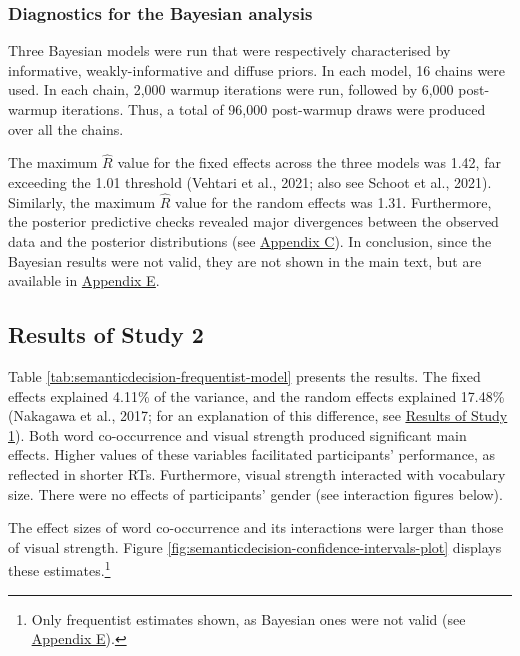 \documentclass[
  12pt,
  man,floatsintext]{apa7}
\begin{document}
\hypertarget{diagnostics-for-the-bayesian-analysis-1}{%
\subsubsection{Diagnostics for the Bayesian analysis}\label{diagnostics-for-the-bayesian-analysis-1}}

Three Bayesian models were run that were respectively characterised by informative, weakly-informative and diffuse priors. In each model, 16 chains were used. In each chain, 2,000 warmup iterations were run, followed by 6,000 post-warmup iterations. Thus, a total of 96,000 post-warmup draws were produced over all the chains.

The maximum \(\widehat R\) value for the fixed effects across the three models was 1.42, far exceeding the 1.01 threshold (Vehtari et al., 2021; also see Schoot et al., 2021). Similarly, the maximum \(\widehat R\) value for the random effects was 1.31. Furthermore, the posterior predictive checks revealed major divergences between the observed data and the posterior distributions (see \protect\hyperlink{appendix-C-Bayesian-analysis-diagnostics}{\underline{Appendix C}}). In conclusion, since the Bayesian results were not valid, they are not shown in the main text, but are available in \protect\hyperlink{appendix-E-Bayesian-analysis-results}{\underline{Appendix E}}.

\hypertarget{results-of-study-2}{%
\subsection{Results of Study 2}\label{results-of-study-2}}

Table \ref{tab:semanticdecision-frequentist-model} presents the results. The fixed effects explained 4.11\% of the variance, and the random effects explained 17.48\% (Nakagawa et al., 2017; for an explanation of this difference, see \protect\hyperlink{semanticpriming-results}{\underline{Results of Study 1}}). Both word co-occurrence and visual strength produced significant main effects. Higher values of these variables facilitated participants' performance, as reflected in shorter RTs. Furthermore, visual strength interacted with vocabulary size. There were no effects of participants' gender (see interaction figures below).

The effect sizes of word co-occurrence and its interactions were larger than those of visual strength. Figure \ref{fig:semanticdecision-confidence-intervals-plot} displays these estimates.\footnote{Only frequentist estimates shown, as Bayesian ones were not valid (see \protect\hyperlink{appendix-E-Bayesian-analysis-results}{\underline{Appendix E}}).}
\end{document}
